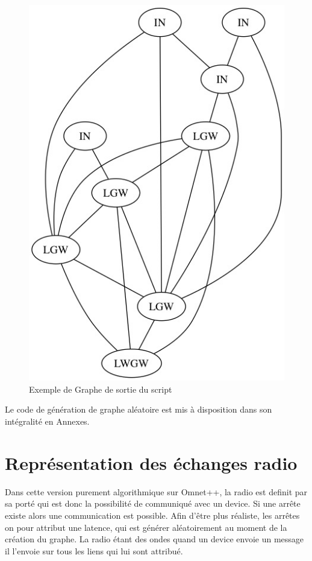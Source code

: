 \begin{figure}[!ht]
\centering
\includegraphics[scale=0.45]{LoRaGraph.jpg} 
\caption{Exemple de Graphe de sortie du script }
\end{figure}
Le code de génération de graphe aléatoire est mis à disposition dans son intégralité en Annexes.
\section{Représentation des échanges radio}
Dans cette version purement algorithmique sur Omnet++, la radio est definit par sa porté qui est donc la possibilité de communiqué avec un device. Si une arrête existe alors une communication est possible. Afin d'être plus réaliste, les arrêtes on pour attribut une latence, qui est générer aléatoirement au moment de la création du graphe. La radio étant des ondes quand un device envoie un message il l'envoie sur tous les liens qui lui sont attribué.

